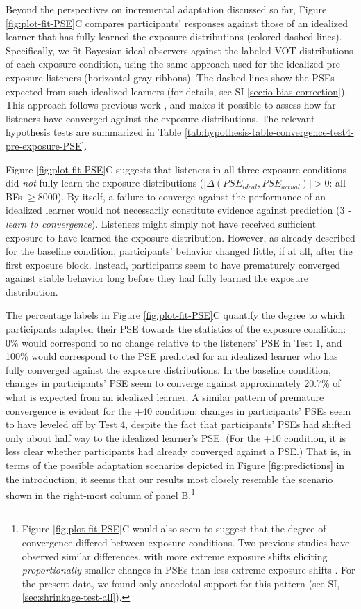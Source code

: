 \documentclass[
  11pt,
  man,mask,floatsintext]{apa6}
\begin{document}
Beyond the perspectives on incremental adaptation discussed so far, Figure \ref{fig:plot-fit-PSE}C compares participants' responses against those of an idealized learner that has fully learned the exposure distributions (colored dashed lines). Specifically, we fit Bayesian ideal observers against the labeled VOT distributions of each exposure condition, using the same approach used for the idealized pre-exposure listeners (horizontal gray ribbons). The dashed lines show the PSEs expected from such idealized learners (for details, see SI \ref{sec:io-bias-correction}). This approach follows previous work \autocite{kleinschmidt-jaeger2016,kleinschmidt2020}, and makes it possible to assess how far listeners have converged against the exposure distributions. The relevant hypothesis tests are summarized in Table \ref{tab:hypothesis-table-convergence-test4-pre-exposure-PSE}.

Figure \ref{fig:plot-fit-PSE}C suggests that listeners in all three exposure conditions did \emph{not} fully learn the exposure distributions (\(|\Delta(PSE_{ideal}, PSE_{actual})| > 0\): all BFs \(\ge 8000\)). By itself, a failure to converge against the performance of an idealized learner would not necessarily constitute evidence against prediction (3 - \emph{learn to convergence}). Listeners might simply not have received sufficient exposure to have learned the exposure distribution. However, as already described for the baseline condition, participants' behavior changed little, if at all, after the first exposure block. Instead, participants seem to have prematurely converged against stable behavior long before they had fully learned the exposure distribution.

The percentage labels in Figure \ref{fig:plot-fit-PSE}C quantify the degree to which participants adapted their PSE towards the statistics of the exposure condition: 0\% would correspond to no change relative to the listeners' PSE in Test 1, and 100\% would correspond to the PSE predicted for an idealized learner who has fully converged against the exposure distributions. In the baseline condition, changes in participants' PSE seem to converge against approximately 20.7\% of what is expected from an idealized learner. A similar pattern of premature convergence is evident for the +40 condition: changes in participants' PSEs seem to have leveled off by Test 4, despite the fact that participants' PSEs had shifted only about half way to the idealized learner's PSE. (For the +10 condition, it is less clear whether participants had already converged against a PSE.) That is, in terms of the possible adaptation scenarios depicted in Figure \ref{fig:predictions} in the introduction, it seems that our results most closely resemble the scenario shown in the right-most column of panel B.\footnote{Figure \ref{fig:plot-fit-PSE}C would also seem to suggest that the degree of convergence differed between exposure conditions. Two previous studies have observed similar differences, with more extreme exposure shifts eliciting \emph{proportionally} smaller changes in PSEs than less extreme exposure shifts \autocite{kleinschmidt-jaeger2016,kleinschmidt2020}. For the present data, we found only anecdotal support for this pattern (see SI, \ref{sec:shrinkage-test-all}).}
\end{document}
